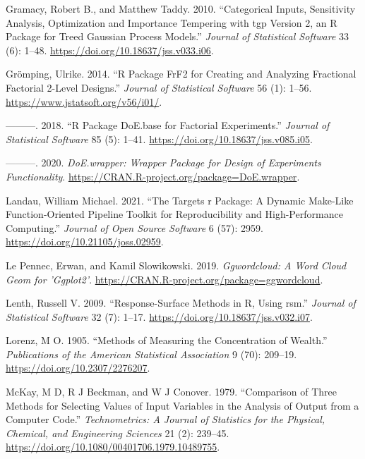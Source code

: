 \documentclass{article}
\newlength{\cslhangindent}
\newlength{\cslentryspacingunit} %
\newenvironment{CSLReferences}[2] %
 {%
  \setlength{\parindent}{0pt}
  \ifodd #1
  \let\oldpar\par
  \def\par{\hangindent=\cslhangindent\oldpar}
  \fi
  \setlength{\parskip}{#2\cslentryspacingunit}
 }%
 {}
\begin{document}
\begin{CSLReferences}{1}{0}
\leavevmode{}%
Gramacy, Robert B., and Matthew Taddy. 2010. {``Categorical Inputs,
Sensitivity Analysis, Optimization and Importance Tempering with {tgp}
Version 2, an {R} Package for Treed Gaussian Process Models.''}
\emph{Journal of Statistical Software} 33 (6): 1--48.
\url{https://doi.org/10.18637/jss.v033.i06}.

\leavevmode{}%
Grömping, Ulrike. 2014. {``{R} Package {FrF2} for Creating and Analyzing
Fractional Factorial 2-Level Designs.''} \emph{Journal of Statistical
Software} 56 (1): 1--56. \url{https://www.jstatsoft.org/v56/i01/}.

\leavevmode{}%
---------. 2018. {``{R} Package {DoE.base} for Factorial Experiments.''}
\emph{Journal of Statistical Software} 85 (5): 1--41.
\url{https://doi.org/10.18637/jss.v085.i05}.

\leavevmode{}%
---------. 2020. \emph{DoE.wrapper: Wrapper Package for Design of
Experiments Functionality}.
\url{https://CRAN.R-project.org/package=DoE.wrapper}.

\leavevmode{}%
Landau, William Michael. 2021. {``The Targets r Package: A Dynamic
Make-Like Function-Oriented Pipeline Toolkit for Reproducibility and
High-Performance Computing.''} \emph{Journal of Open Source Software} 6
(57): 2959. \url{https://doi.org/10.21105/joss.02959}.

\leavevmode{}%
Le Pennec, Erwan, and Kamil Slowikowski. 2019. \emph{Ggwordcloud: A Word
Cloud Geom for 'Ggplot2'}.
\url{https://CRAN.R-project.org/package=ggwordcloud}.

\leavevmode{}%
Lenth, Russell V. 2009. {``Response-Surface Methods in {R}, Using
{rsm}.''} \emph{Journal of Statistical Software} 32 (7): 1--17.
\url{https://doi.org/10.18637/jss.v032.i07}.

\leavevmode{}%
Lorenz, M O. 1905. {``Methods of Measuring the Concentration of
Wealth.''} \emph{Publications of the American Statistical Association} 9
(70): 209--19. \url{https://doi.org/10.2307/2276207}.

\leavevmode{}%
McKay, M D, R J Beckman, and W J Conover. 1979. {``Comparison of Three
Methods for Selecting Values of Input Variables in the Analysis of
Output from a Computer Code.''} \emph{Technometrics: A Journal of
Statistics for the Physical, Chemical, and Engineering Sciences} 21 (2):
239--45. \url{https://doi.org/10.1080/00401706.1979.10489755}.


\end{CSLReferences}
\end{document}
